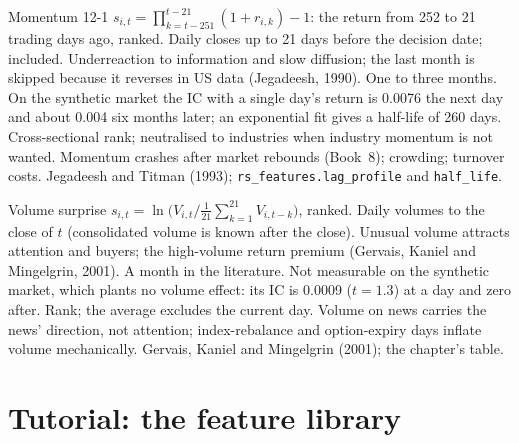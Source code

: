 \begin{predictorcard}{Momentum 12-1}\label{pred:rs:price-and-volume-features:momentum}
 $s_{i,t} = \prod_{k=t-251}^{t-21}(1 + r_{i,k}) - 1$: the return from 252 to 21 trading days ago, ranked.
 Daily closes up to 21 days before the decision date;  included.
 Underreaction to information and slow diffusion; the last month is skipped because it reverses in US data
(Jegadeesh, 1990).
 One to three months. On the synthetic market the IC with a single day's return is 0.0076 the next day and
about 0.004 six months later; an exponential fit gives a half-life of 260 days.
 Cross-sectional rank; neutralised to industries when industry momentum is not wanted.
 Momentum crashes after market rebounds (Book~8); crowding; turnover costs.
 Jegadeesh and Titman (1993); \texttt{rs\_features.lag\_profile} and \texttt{half\_life}.
\end{predictorcard}

\begin{predictorcard}{Volume surprise}\label{pred:rs:price-and-volume-features:volume}
 $s_{i,t} = \ln\bigl(V_{i,t}/\tfrac1{21}\sum_{k=1}^{21}V_{i,t-k}\bigr)$, ranked.
 Daily volumes to the close of $t$ (consolidated volume is known after the close).
 Unusual volume attracts attention and buyers; the high-volume return premium (Gervais, Kaniel and Mingelgrin, 2001).
 A month in the literature. Not measurable on the synthetic market, which plants no volume effect: its IC
is 0.0009 ($t = 1.3$) at a day and zero after.
 Rank; the average excludes the current day.
 Volume on news carries the news' direction, not attention; index-rebalance and option-expiry days inflate volume
mechanically.
 Gervais, Kaniel and Mingelgrin (2001); the chapter's table.
\end{predictorcard}

\section{Tutorial: the feature library}\label{tut:rs:price-and-volume-features:library}


